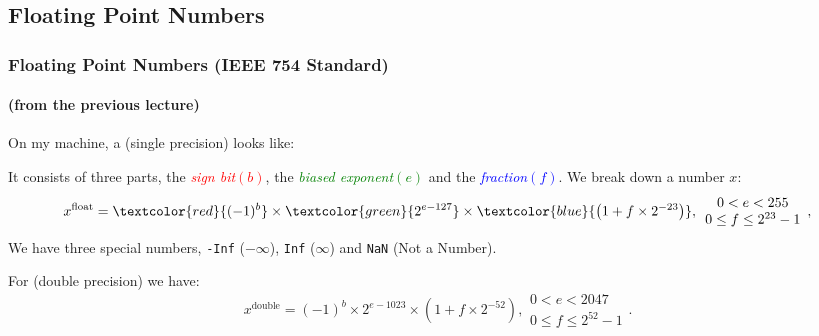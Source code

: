 \documentclass[smaller,table]{beamer}
\begin{document}
\subsection{Floating Point Numbers}
\begin{frame}
\frametitle{Floating Point Numbers (IEEE 754 Standard)}
\framesubtitle{(from the previous lecture)}
On my machine, a  (single precision) looks like:\\
\begin{center}
\end{center}
It consists of three parts, the \textcolor{red}{\emph{sign bit}$(b)$}, the \textcolor{green}{\emph{biased exponent}$(e)$} and the \textcolor{blue}{\emph{fraction}$(f)$}.
We break down a number $x$:
$$x^{\textrm{float}} = \textcolor{red}{(-1)^b} \times 
\textcolor{green}{2^{e-127}} \times \textcolor{blue}{\left(1+f\times2^{-23}\right)},
\begin{array}{c}
0 < e < 255\\0 \leq f \leq 2^{23}-1
\end{array},$$
We have three special numbers, {\tt -Inf} ($-\infty$), {\tt Inf} ($\infty$) and {\tt NaN} (Not a Number).

For  (double precision) we have:
$$x^{\textrm{double}} = (-1)^b\times 2^{e-1023}\times\left(1+f\times2^{-52}\right),
\begin{array}{c}
0 < e < 2047\\0 \leq f \leq 2^{52}-1
\end{array}.$$
\end{frame}
\end{document}
